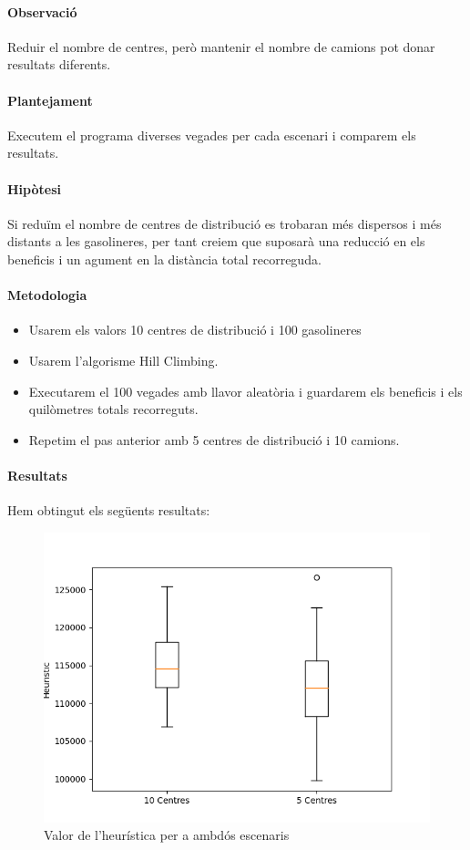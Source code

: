 \documentclass[a4paper]{article}
\begin{document}
\paragraph{Observació} Reduir el nombre de centres, però mantenir el nombre de camions pot donar resultats diferents.
\paragraph{Plantejament} Executem el programa diverses vegades per cada escenari i comparem els resultats.
\paragraph{Hipòtesi} Si reduïm el nombre de centres de distribució es trobaran més dispersos i més distants a les gasolineres, per tant creiem que suposarà una reducció en els beneficis i un agument en la distància total recorreguda.
\paragraph{Metodologia}
\begin{itemize}
\item Usarem els valors 10 centres de distribució i 100 gasolineres
\item Usarem l'algorisme Hill Climbing.
\item Executarem el 100 vegades amb llavor aleatòria i guardarem els beneficis i els quilòmetres totals recorreguts.
\item Repetim el pas anterior amb 5 centres de distribució i 10 camions.
\end{itemize}
\paragraph{Resultats} Hem obtingut els següents resultats:

\begin{figure}[htp]
\centering
\includegraphics[scale=0.65]{images/experiment-5-2.png}
\caption{Valor de l'heurística per a ambdós escenaris}
\centering
\end{figure}
\end{document}
